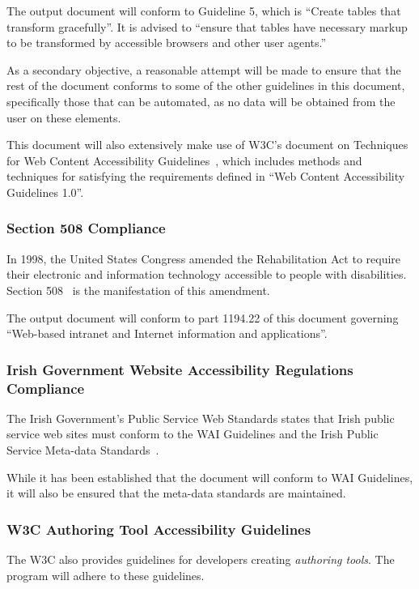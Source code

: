 The output document will conform to Guideline 5, which is ``Create tables that
transform gracefully''. It is advised to ``ensure that tables have necessary
markup to be transformed by accessible browsers and other user agents.''

As a secondary objective, a reasonable attempt will be made to ensure
that the rest of the document conforms to some of the other guidelines in this
document, specifically those that can be automated, as no data will be obtained from
the user on these elements.

This document will also extensively make use of W3C's document on Techniques
for Web Content Accessibility Guidelines~\cite{w3c:wcagtechs}, which includes
methods and techniques for satisfying the requirements defined in ``Web Content
Accessibility Guidelines 1.0''.

\subsubsection{Section 508 Compliance}

In 1998, the United States Congress amended the Rehabilitation Act to require
their electronic and information technology accessible to people with
disabilities. Section 508~\cite{section508} is the manifestation of this
amendment.

The output document will conform to part 1194.22 of this document governing
``Web-based intranet and Internet information and applications''.

\subsubsection{Irish Government Website Accessibility Regulations Compliance}

The Irish Government's Public Service Web Standards states that Irish public
service web sites must conform to the WAI Guidelines and the Irish Public
Service Meta-data Standards~\cite{irishgov}.

While it has been established that the document will conform to WAI Guidelines, it
will also be ensured that the meta-data standards are maintained.

\subsubsection{W3C Authoring Tool Accessibility Guidelines} 

The W3C also provides guidelines for developers creating \emph{authoring
tools}\cite{w3c:atag}. The program will adhere to these guidelines.


